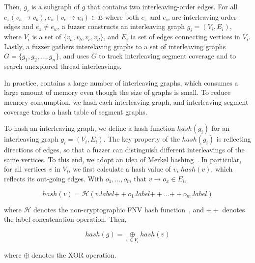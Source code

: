Then, $g_i$ is a subgraph of $g$ that contains two interleaving-order
edges.
%
For all $e_z (v_a \rightarrow v_b), e_w (v_c \rightarrow v_d) \in E$
where both $e_z$ and $e_w$ are interleaving-order edges and
$e_z \neq e_w$, a fuzzer constructs an interleaving graph
$g_i = (V_i, E_i)$, where $V_i$ is a set of $\{v_a, v_b, v_c, v_d\}$,
and $E_i$ ia set of edges connecting vertices in $V_i$.
%
Lastly, a fuzzer gathers interelaving graphs to a set of interleaving
graphs $G = \{g_1, g_2, ..., g_n\}$, and uses $G$ to track
interleaving segment coverage and to search unexplored thread
interleavings.






%
In practice, \intcov contains a large number of interleaving graphs,
which consumes a large amount of memory even though the size of graphs
is small.
%
To reduce memory consumption, we hash each interleaving graph,
and interleaving segment coverage tracks a hash table of segment
graphs.



To hash an interleaving graph, we define a hash function $hash(g_i)$
for an interleaving graph $g_i = (V_i, E_i)$.
%
The key property of the $hash(g_i)$ is reflecting directions of edges,
so that a fuzzer can distinguish different interleavings of the same
vertices.
%
To this end, we adopt an idea of Merkel hashing~\cite{treehashing,
  treehashing2}.
%
In particular, for all vertices $v$ in $V_i$, we first calculate a
hash value of $v$, $hash(v)$, which reflects its out-going edges. With
$o_1, ..., o_m$ that $v \rightarrow o_x \in E_i$,
%

\[ hash(v) = \mathcal{H}(v.label {++} o_1.label {++} ... {++}
  o_m.label) \]

where $\mathcal{H}$ denotes the
non-cryptographic FNV hash function~\cite{fnv, fnv-go}, and ${++}$
denotes the label-concatenation operation.
%
Then,

\[
  hash(g) = \underset{v \in V_i}{\oplus} hash(v)
\]

where $\oplus$ denotes the XOR operation.







